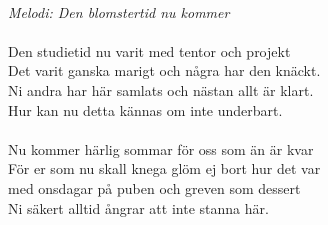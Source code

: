 \\
{\footnotesize\textit{Melodi: Den blomstertid nu kommer}}\\
\\
Den studietid nu varit med tentor och projekt\\
Det varit ganska marigt och några har den knäckt.\\
Ni andra har här samlats och nästan allt är klart.\\
Hur kan nu detta kännas om inte underbart.\\
\\
Nu kommer härlig sommar för oss som än är kvar\\
För er som nu skall knega glöm ej bort hur det var\\
med onsdagar på puben och greven som dessert\\
Ni säkert alltid ångrar att inte stanna här.
